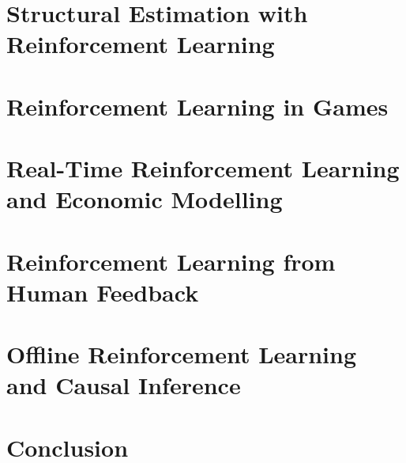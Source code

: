 \documentclass[11pt,notitlepage,a4paper]{article}
\begin{document}
\section{Structural Estimation with Reinforcement Learning}
\label{section:rl_econ_models}


\section{Reinforcement Learning in Games}
\label{section:rl_games}


\section{Real-Time Reinforcement Learning and Economic Modelling}
\label{section:bandits}


\section{Reinforcement Learning from Human Feedback}
\label{section:rlhf}


\section{Offline Reinforcement Learning and Causal Inference}
\label{section:causal_rl}


\section{Conclusion}
\label{section:conclusion}





\end{document}
